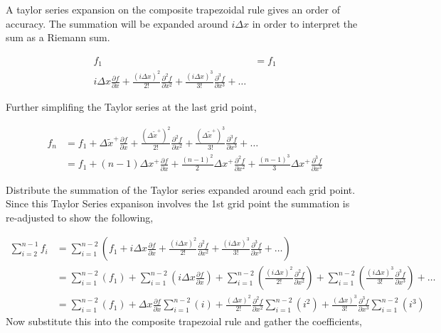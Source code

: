 \documentclass[12pt]{article}
\begin{document}
A taylor series expansion on the composite trapezoidal rule gives an order of
accuracy.  The summation will be expanded around $ i \Delta x$ in order to
interpret the sum as a Riemann sum.

\begin{align*}
    f_1  &= f_1\\
    i\Delta x \frac{\partial f }{\partial x } +
    \frac{(i\Delta x)^2}{2!} \frac{\partial^2 f }{\partial x^2 } +
    \frac{(i\Delta x)^3}{3!} \frac{\partial^3 f }{\partial x^3 } + \dots
\end{align*}

Further simplifing the Taylor series at the last grid point,

\begin{align*} 
    f_n &= f_1 + 
    \Delta \widetilde{x}^+\frac{\partial f }{\partial x  } +
    \frac{(\Delta \widetilde{x}^+)^2}{2!}\frac{\partial^2 f }{\partial x^2  } +
    \frac{(\Delta \widetilde{x}^+)^3}{3!}\frac{\partial^3 f }{\partial x^3  } + \dots \\
        &= 
        f_1 +
        \left( n - 1 \right)\Delta x^+ 
        \frac{\partial f}{\partial x} +
        \frac{\left( n - 1 \right)^2}{2}\Delta x^+ 
        \frac{\partial^2 f}{\partial x^2} +
        \frac{\left( n - 1 \right)^3}{3}\Delta x^+ 
        \frac{\partial^3 f}{\partial x^3}
\end{align*}

Distribute the summation of the Taylor series expanded around each grid point.
Since this Taylor Series expanison involves the 1st grid point the summation 
is re-adjusted to show the following, 

\begin{align*}
    \sum_{i = 2}^{n - 1} f_i  &= 
    \sum_{i = 1}^{n - 2} \left( 
    f_1 +
    i\Delta x \frac{\partial f }{\partial x } +
    \frac{(i\Delta x)^2}{2!} \frac{\partial^2 f }{\partial x^2 } +
    \frac{(i\Delta x)^3}{3!} \frac{\partial^3 f }{\partial x^3 } + \dots
    \right) \\
                              &=
    \sum_{i = 1}^{n - 2} \left( 
    f_1 \right) +
    \sum_{i = 1}^{n - 2} \left( 
    i\Delta x \frac{\partial f }{\partial x }\right) +
    \sum_{i = 1}^{n - 2} \left( 
    \frac{(i\Delta x)^2}{2!} \frac{\partial^2 f }{\partial x^2 } \right)+
    \sum_{i = 1}^{n - 2} \left( 
    \frac{(i\Delta x)^3}{3!} \frac{\partial^3 f }{\partial x^3 } \right)+ \dots\\ 
                              &=
    \sum_{i = 1}^{n - 2} \left( 
    f_1 \right) +
 \Delta x \frac{\partial f }{\partial x }   
     \sum_{i = 1}^{n - 2} \left( i\right) +
    \frac{(\Delta x)^2}{2!} \frac{\partial^2 f }{\partial x^2 } 
    \sum_{i = 1}^{n - 2} \left( i^2 \right)
    +
    \frac{(\Delta x)^3}{3!} \frac{\partial^3 f }{\partial x^3 } 
    \sum_{i = 1}^{n - 2} \left( i^3 \right)
\end{align*} 
Now substitute this into the composite trapezoial rule and gather the coefficients, 
\end{document}
